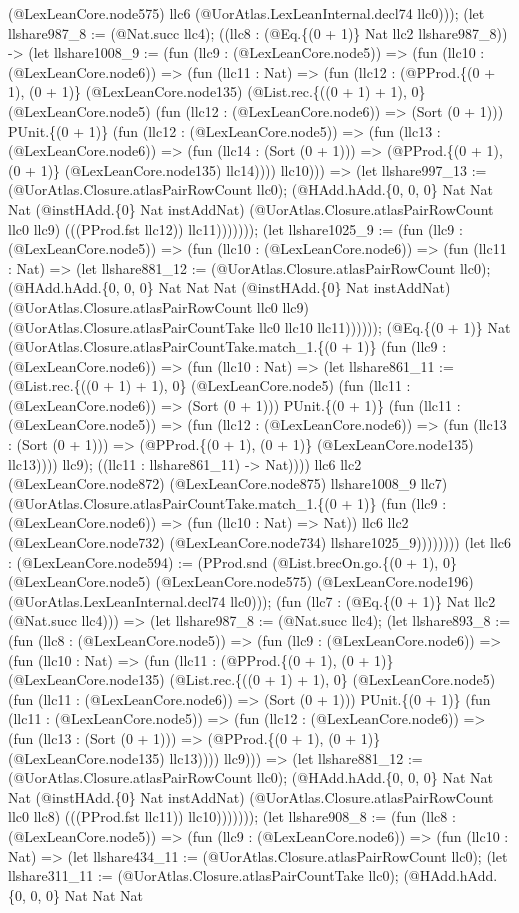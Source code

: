 \documentclass[11pt]{article}
\begin{document}
(@LexLeanCore.node575) llc6 (@UorAtlas.LexLeanInternal.decl74 llc0))); (let llshare987\_8 := (@Nat.succ llc4); ((llc8 : (@Eq.\{(0 + 1)\} Nat llc2 llshare987\_8)) -> (let llshare1008\_9 := (fun (llc9 : (@LexLeanCore.node5)) => (fun (llc10 : (@LexLeanCore.node6)) => (fun (llc11 : Nat) => (fun (llc12 : (@PProd.\{(0 + 1), (0 + 1)\} (@LexLeanCore.node135) (@List.rec.\{((0 + 1) + 1), 0\} (@LexLeanCore.node5) (fun (llc12 : (@LexLeanCore.node6)) => (Sort (0 + 1))) PUnit.\{(0 + 1)\} (fun (llc12 : (@LexLeanCore.node5)) => (fun (llc13 : (@LexLeanCore.node6)) => (fun (llc14 : (Sort (0 + 1))) => (@PProd.\{(0 + 1), (0 + 1)\} (@LexLeanCore.node135) llc14)))) llc10))) => (let llshare997\_13 := (@UorAtlas.Closure.atlasPairRowCount llc0); (@HAdd.hAdd.\{0, 0, 0\} Nat Nat Nat (@instHAdd.\{0\} Nat instAddNat) (@UorAtlas.Closure.atlasPairRowCount llc0 llc9) (((PProd.fst llc12)) llc11))))))); (let llshare1025\_9 := (fun (llc9 : (@LexLeanCore.node5)) => (fun (llc10 : (@LexLeanCore.node6)) => (fun (llc11 : Nat) => (let llshare881\_12 := (@UorAtlas.Closure.atlasPairRowCount llc0); (@HAdd.hAdd.\{0, 0, 0\} Nat Nat Nat (@instHAdd.\{0\} Nat instAddNat) (@UorAtlas.Closure.atlasPairRowCount llc0 llc9) (@UorAtlas.Closure.atlasPairCountTake llc0 llc10 llc11)))))); (@Eq.\{(0 + 1)\} Nat (@UorAtlas.Closure.atlasPairCountTake.match\_1.\{(0 + 1)\} (fun (llc9 : (@LexLeanCore.node6)) => (fun (llc10 : Nat) => (let llshare861\_11 := (@List.rec.\{((0 + 1) + 1), 0\} (@LexLeanCore.node5) (fun (llc11 : (@LexLeanCore.node6)) => (Sort (0 + 1))) PUnit.\{(0 + 1)\} (fun (llc11 : (@LexLeanCore.node5)) => (fun (llc12 : (@LexLeanCore.node6)) => (fun (llc13 : (Sort (0 + 1))) => (@PProd.\{(0 + 1), (0 + 1)\} (@LexLeanCore.node135) llc13)))) llc9); ((llc11 : llshare861\_11) -> Nat)))) llc6 llc2 (@LexLeanCore.node872) (@LexLeanCore.node875) llshare1008\_9 llc7) (@UorAtlas.Closure.atlasPairCountTake.match\_1.\{(0 + 1)\} (fun (llc9 : (@LexLeanCore.node6)) => (fun (llc10 : Nat) => Nat)) llc6 llc2 (@LexLeanCore.node732) (@LexLeanCore.node734) llshare1025\_9)))))))) (let llc6 : (@LexLeanCore.node594) := (PProd.snd (@List.brecOn.go.\{(0 + 1), 0\} (@LexLeanCore.node5) (@LexLeanCore.node575) (@LexLeanCore.node196) (@UorAtlas.LexLeanInternal.decl74 llc0))); (fun (llc7 : (@Eq.\{(0 + 1)\} Nat llc2 (@Nat.succ llc4))) => (let llshare987\_8 := (@Nat.succ llc4); (let llshare893\_8 := (fun (llc8 : (@LexLeanCore.node5)) => (fun (llc9 : (@LexLeanCore.node6)) => (fun (llc10 : Nat) => (fun (llc11 : (@PProd.\{(0 + 1), (0 + 1)\} (@LexLeanCore.node135) (@List.rec.\{((0 + 1) + 1), 0\} (@LexLeanCore.node5) (fun (llc11 : (@LexLeanCore.node6)) => (Sort (0 + 1))) PUnit.\{(0 + 1)\} (fun (llc11 : (@LexLeanCore.node5)) => (fun (llc12 : (@LexLeanCore.node6)) => (fun (llc13 : (Sort (0 + 1))) => (@PProd.\{(0 + 1), (0 + 1)\} (@LexLeanCore.node135) llc13)))) llc9))) => (let llshare881\_12 := (@UorAtlas.Closure.atlasPairRowCount llc0); (@HAdd.hAdd.\{0, 0, 0\} Nat Nat Nat (@instHAdd.\{0\} Nat instAddNat) (@UorAtlas.Closure.atlasPairRowCount llc0 llc8) (((PProd.fst llc11)) llc10))))))); (let llshare908\_8 := (fun (llc8 : (@LexLeanCore.node5)) => (fun (llc9 : (@LexLeanCore.node6)) => (fun (llc10 : Nat) => (let llshare434\_11 := (@UorAtlas.Closure.atlasPairRowCount llc0); (let llshare311\_11 := (@UorAtlas.Closure.atlasPairCountTake llc0); (@HAdd.hAdd.\{0, 0, 0\} Nat Nat Nat 
\end{document}
